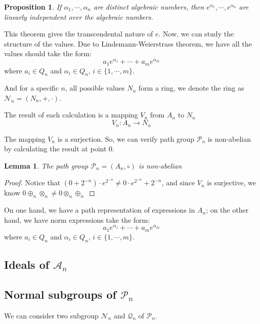 \documentclass{article}
\newtheorem{lemma}{Lemma}
\newtheorem{proposition}{Proposition}
\begin{document}
\begin{proposition}
\label{proposition:LindemannWeierstrass}
If $\alpha_1, \cdots, \alpha_n$ are distinct algebraic numbers, then $e^{\alpha_1}, \cdots, e^{\alpha_n}$ are linearly independent over the algebraic numbers.
\end{proposition}

This theorem gives the transcendental nature of $e$. Now, we can study the structure of the values.
Due to Lindemann-Weierstrass theorem, we have all the values should take the form:
$$
a_1 e^{\alpha_1} + \cdots + a_m e^{\alpha_m}
$$
where $a_i \in Q_n$ and $\alpha_i \in Q_n$, $i \in \{1, \cdots, m\}$.

And for a specific $n$, all possible values $N_n$ form a ring, we denote the ring as $\mathcal{N}_n = (N_n, +, \cdot)$.

The result of each calculation is a mapping $V_n$ from $A_n$ to $N_n$
$$ V_n: A_n \to N_n $$

The mapping $V_n$ is a surjection.
So, we can verify path group $\mathcal{P}_n$ is non-abelian by calculating the result at point $0$.

\begin{lemma}
\label{lemma:nonabelian}
The path group $\mathcal{P}_n = (A_n, \circ)$ is non-abelian
\end{lemma}

\begin{proof}
Notice that $(0 + 2^{-n}) \cdot e^{2^{-n}} \neq 0 \cdot e^{2^{-n}} + 2^{-n}$, and since $V_n$ is surjective, we know $0 \oplus_n \otimes_n \neq 0 \otimes_n \oplus_n$
\qedhere
\end{proof}

On one hand, we have a path representation of expressions in $A_n$;
on the other hand, we have norm expressions take the form:
$$
a_1 e^{\alpha_1} + \cdots + a_m e^{\alpha_m}
$$
where $a_i \in Q_n$ and $\alpha_i \in Q_n$, $i \in \{1, \cdots, m\}$.

\subsection{Ideals of $\mathcal{A}_n$}\label{sec:ideals}

\subsection{Normal subgroups of $\mathcal{P}_n$}\label{sec:normalgroups}

We can consider two subgroup $\mathcal{N}_n$ and $\mathcal{Q}_n$ of $\mathcal{P}_n$.
\end{document}

